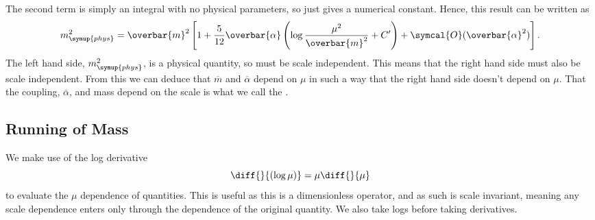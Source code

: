 \documentclass[fleqn]{NotesClass}
\newcommand{\order}{\symcal{O}}
\newcommand{\phys}{\symup{phys}}
\begin{document}
    The second term is simply an integral with no physical parameters, so just gives a numerical constant.
    Hence, this result can be written as
    \begin{equation}
        m_{\phys}^2 = \overbar{m}^2 \left[ 1 + \frac{5}{12}\overbar{\alpha}\left( \log\frac{\mu^2}{\overbar{m}^2} + C' \right) + \order(\overbar{\alpha}^2) \right].
    \end{equation}
    The left hand side, \(m_{\phys}^2\), is a physical quantity, so must be scale independent.
    This means that the right hand side must also be scale independent.
    From this we can deduce that \(\overbar{m}\) and \(\overbar{\alpha}\) depend on \(\mu\) in such a way that the right hand side doesn't depend on \(\mu\).
    That the coupling, \(\overbar{\alpha}\), and mass depend on the scale is what we call the .
    
    \subsection{Running of Mass}
    We make use of the log derivative
    \begin{equation}
        \diff{}{(\log \mu)} = \mu \diff{}{\mu}
    \end{equation}
    to evaluate the \(\mu\) dependence of quantities.
    This is useful as this is a dimensionless operator, and as such is scale invariant, meaning any scale dependence enters only through the dependence of the original quantity.
    We also take logs before taking derivatives.
    
\end{document}
